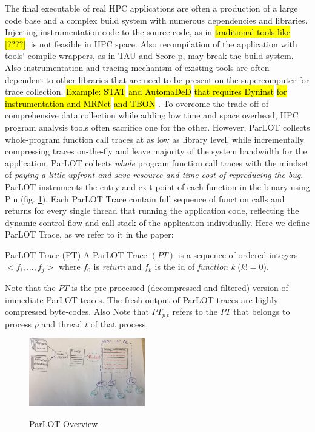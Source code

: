 The final executable of real HPC applications are often a production of a large code base and a complex build system with numerous dependencies and libraries. Injecting instrumentation code to the source code, as in \hl{traditional tools like [????]}, is not feasible in HPC space. Also recompilation of the application with tools` compile-wrappers, as in TAU\cite{tau} and Score-p\cite{scorep}, may break the build system.
Also instrumentation and tracing mechanism of existing tools are often dependent to other libraries that are need to be present on the supercomputer for trace collection. \hl{Example: STAT}\cite{stat}\hl{ and AutomaDeD}\cite{automaded-laguna}\hl{ that requires Dyninst}\cite{dyninst}\hl{ for instrumentation and MRNet}\cite{mrnet}\hl{ and TBON }\cite{tbon}.
%
To overcome the trade-off of comprehensive data collection while adding low time and space overhead, HPC program analysis tools often sacrifice one for the other. However, ParLOT collects whole-program function call traces at as low as library level, while incrementally compressing traces on-the-fly and leave majority of the system bandwidth for the application.
%
ParLOT collects \textit{whole} program function call traces with the mindset of \textit{paying a little upfront and save resource and time cost of reproducing the bug}.
%
ParLOT instruments the entry and exit point of each function in the binary using Pin\cite{pin} (fig. \ref{fig.parlotOverview}). Each ParLOT Trace contain full sequence of function calls and returns for every single thread that running the application code, reflecting the dynamic control flow and call-stack of the application individually.
%
Here we define ParLOT Trace, as we refer to it in the paper:

\begin{definition}{ParLOT Trace (PT)}
A ParLOT Trace $(PT)$ is a sequence of ordered integers $<f_i,...,f_j>$ where $f_0$ is \textit{return} and $f_k$ is the id of \textit{function k} ($k!=0$).
\end{definition}
%
Note that the $PT$ is the pre-processed (decompressed and filtered) version of immediate ParLOT traces. The fresh output of ParLOT traces are highly compressed byte-codes.
%
Also Note that $PT_{p.t}$ refers to the $PT$ that belongs to process $p$ and thread $t$ of that process.
%
\begin{figure}[t]
\caption{ParLOT Overview}
\includegraphics[width=0.45\textwidth]{figs/parlotOverview.jpg}
\label{fig.parlotOverview}
\end{figure}

